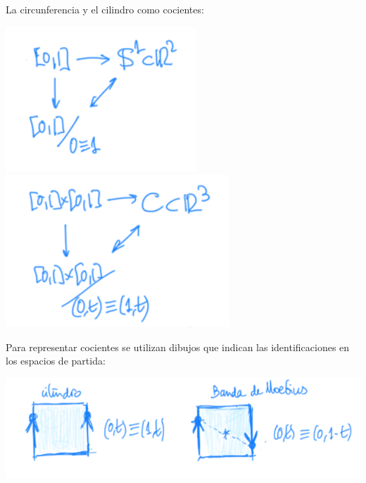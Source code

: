 \begin{ej}[Anteriores]
La circunferencia y el cilindro como cocientes:
\begin{center}
    \includegraphics[scale=0.4]{images/ej_cociente_1} 
    \includegraphics[scale=0.4]{images/ej_cociente_2}
\end{center}

Para representar cocientes se utilizan dibujos que indican las identificaciones en los espacios de partida:
\begin{center}
    \includegraphics[scale=0.3]{images/ej_cociente_3} 
\end{center}
\end{ej}


